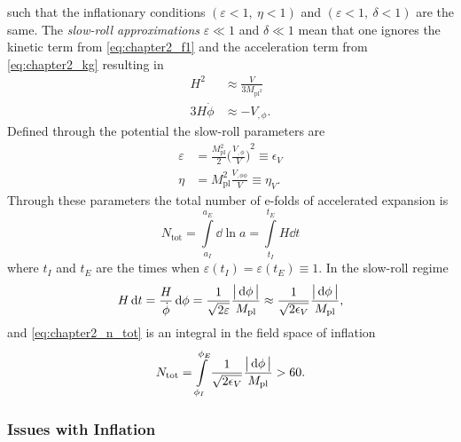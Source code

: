 %
such that the inflationary conditions \((\varepsilon<1,\ \eta<1)\) and \((\varepsilon<1,\ \delta<1)\) are the same.
The \emph{slow-roll approximations} \(\varepsilon \ll 1\) and \(\delta \ll 1\) mean that one ignores the kinetic term from \cref{eq:chapter2_f1} and the acceleration term from \cref{eq:chapter2_kg} resulting in
%
\begin{subequations}
	\begin{align}
		H^{2}        & \approx \frac{V}{3M_{\text{pl}^{2}}} \\
		3H\dot{\phi} & \approx -V_{,\phi}.
	\end{align}
\end{subequations}
%
Defined through the potential the slow-roll parameters are
%
\begin{subequations}
	\begin{align}
		\varepsilon & = \frac{M_{\text{pl}}^{2}}{2} {\bigg(\frac{V_{,\phi}}{V}\bigg)}^{2} \equiv \epsilon_{V} \\
		\eta        & = M_{\text{pl}}^{2} \frac{V_{,\phi\phi}}{V} \equiv \eta_{V}.
	\end{align}
\end{subequations}
%
Through these parameters the total number of e-folds of accelerated expansion is
%
\begin{equation}\label{eq:chapter2_n_tot}
	N_{\text{tot}}
	= \int\limits_{a_{I}}^{a_{E}} \dd{\ln{a}}
	= \int\limits_{t_{I}}^{t_{E}} H \dd{t}
\end{equation}
%
where \(t_{I}\) and \(t_{E}\) are the times when \(\varepsilon(t_{I}) = \varepsilon(t_{E}) \equiv 1\).
In the slow-roll regime
%
\begin{equation}
	H \dd{t}
	= \frac{H}{\dot{\phi}} \dd{\phi}
	= \frac{1}{\sqrt{2\varepsilon}} \frac{\big\lvert\dd{\phi}\big\rvert}{M_{\text{pl}}}
	\approx \frac{1}{\sqrt{2\epsilon_{V}}} \frac{\big\lvert\dd{\phi}\big\rvert}{M_{\text{pl}}},
\end{equation}
%
and \cref{eq:chapter2_n_tot} is an integral in the field space of inflation
%
\begin{equation}
	N_{\text{tot}}
	= \int\limits_{\phi_{I}}^{\phi_{E}}  \frac{1}{\sqrt{2\epsilon_{V}}} \frac{\big\lvert\dd{\phi}\big\rvert}{M_{\text{pl}}}
	> 60.
\end{equation}

\subsubsection{Issues with Inflation}

